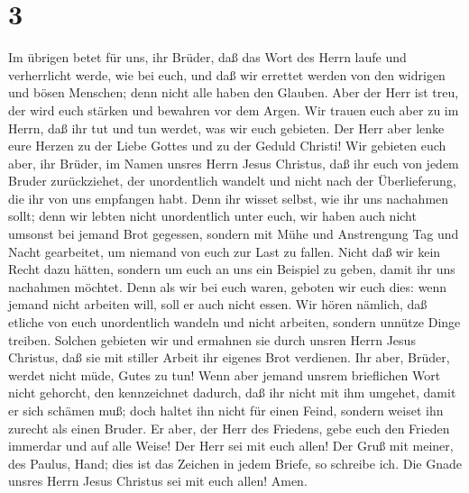 \hypertarget{section-2}{%
\section{3}\label{section-2}}

 Im übrigen betet für uns, ihr Brüder, daß das Wort des
Herrn laufe und verherrlicht werde, wie bei euch,  und daß
wir errettet werden von den widrigen und bösen Menschen; denn nicht alle
haben den Glauben.  Aber der Herr ist treu, der wird euch
stärken und bewahren vor dem Argen.  Wir trauen euch aber
zu im Herrn, daß ihr tut und tun werdet, was wir euch gebieten.
 Der Herr aber lenke eure Herzen zu der Liebe Gottes und
zu der Geduld Christi!  Wir gebieten euch aber, ihr
Brüder, im Namen unsres Herrn Jesus Christus, daß ihr euch von jedem
Bruder zurückziehet, der unordentlich wandelt und nicht nach der
Überlieferung, die ihr von uns empfangen habt.  Denn ihr
wisset selbst, wie ihr uns nachahmen sollt; denn wir lebten nicht
unordentlich unter euch,  wir haben auch nicht umsonst bei
jemand Brot gegessen, sondern mit Mühe und Anstrengung Tag und Nacht
gearbeitet, um niemand von euch zur Last zu fallen.  Nicht
daß wir kein Recht dazu hätten, sondern um euch an uns ein Beispiel zu
geben, damit ihr uns nachahmen möchtet.  Denn als wir bei
euch waren, geboten wir euch dies: wenn jemand nicht arbeiten will, soll
er auch nicht essen.  Wir hören nämlich, daß etliche von
euch unordentlich wandeln und nicht arbeiten, sondern unnütze Dinge
treiben.  Solchen gebieten wir und ermahnen sie durch
unsren Herrn Jesus Christus, daß sie mit stiller Arbeit ihr eigenes Brot
verdienen.  Ihr aber, Brüder, werdet nicht müde, Gutes zu
tun!  Wenn aber jemand unsrem brieflichen Wort nicht
gehorcht, den kennzeichnet dadurch, daß ihr nicht mit ihm umgehet, damit
er sich schämen muß;  doch haltet ihn nicht für einen
Feind, sondern weiset ihn zurecht als einen Bruder.  Er
aber, der Herr des Friedens, gebe euch den Frieden immerdar und auf alle
Weise! Der Herr sei mit euch allen!  Der Gruß mit meiner,
des Paulus, Hand; dies ist das Zeichen in jedem Briefe, so schreibe ich.
 Die Gnade unsres Herrn Jesus Christus sei mit euch
allen! Amen.
